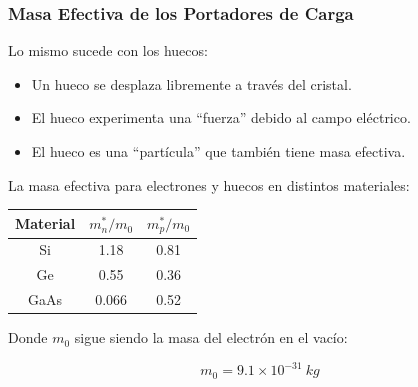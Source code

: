 \documentclass[10pt,t,aspectratio=169]{beamer}
\begin{document}
\begin{frame}[t]
  \frametitle{Masa Efectiva de los Portadores de Carga}

  Lo mismo sucede con los huecos:

  \begin{itemize}
    \item Un hueco se desplaza libremente a través del cristal.
    \item El hueco experimenta una ``fuerza'' debido al campo eléctrico.
    \item El hueco es una ``partícula'' que también tiene masa efectiva.
  \end{itemize}

  \vspace{3mm}
La masa efectiva para electrones y huecos en distintos materiales:

\begin{table}[H]
  \centering
  \begin{tabular}{ccc}
  \hline \textbf{Material} & $m_n^*/m_0$ & $m_p^*/m_0$ \\
  \hline Si & 1.18 & 0.81 \\
  Ge & 0.55 & 0.36 \\
  GaAs & 0.066 & 0.52 \\
  \hline
\end{tabular}
\end{table}

Donde $m_0$ sigue siendo la masa del electrón en el vacío:

\[ m_0=9.1\times{}10^{-31}\ kg \]
\end{frame}
\end{document}
